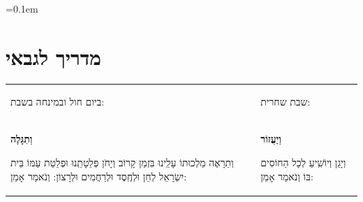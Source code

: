 \documentclass[a4paper, twoside, openany, parskip=half, 12pt]{article}
\newlength\iiindent
\newcommand\secindent{%
 \parshape 3 0pt \linewidth 0pt\dimexpr\linewidth-\iiindent\relax 0pt \linewidth
}
\begin{document}
\everypar{\secindent}
\setcounter{secnumdepth}{-1}
\setcounter{tocdepth}{1}
\addtolength{\topskip}{0pt plus 10pt}

 \font=0.1em%


\setlength{\emergencystretch}{3em} %








\newcommand{\source}[1]{\noindent \begin{tiny} \marginpar{\textsf{(#1)}} \end{tiny}}

\newcommand{\instruction}[1]{\noindent \begin{scriptsize} \textsf{#1} \end{scriptsize}}

\newcommand{\firstword}[1]{\begin{large}\textbf{#1}\end{large}} 

\newenvironment{sometimes}[1]{\begin{mdframed}[linecolor=sometimes, backgroundcolor=sometimes]
\leftskip=0pt plus-.5fil
\rightskip=0pt plus.5fil
\parfillskip=0pt plus1fil
}{\end{mdframed}} %

\newenvironment{kaddish}[1]{\begin{center}\begin{footnotesize}
		\leftskip=0pt plus-.5fil
		\rightskip=0pt plus.5fil
		\parfillskip=0pt plus1fil
	}{\end{footnotesize}\end{center}}



\section{ מדריך לגבאי }

\begin{tabular}{>{\centering\arraybackslash}m{} | >{\centering\arraybackslash}m{}}
\instruction{ביום חול ובמינחה בשבת:} & \instruction{שבת שחרית:} \\
 \firstword{וְתִגָּלֶה}
 וְתֵרָאֶה מַלְכוּתוֹ עָלֵֽינוּ בִּזְמַן קָרוֹב וְיָחֹן פְּלֵטָתֵֽנוּ וּפְלֵטַת עַמּוֹ בֵּית יִשְׂרָאֵל לְחֵן וּלְחֶֽסֶד וּלְרַחֲמִים וּלְרָצוֹן: וְנֹאמַר אָמֵן: 
 &
\firstword{וְיַעֲזוֹר}
וְיָגֵן וְיוֹשִֽׁיעַ לְכָל הַחוֹסִים בּוֹ וְנֹאמַר אָמֵן:
 \end{tabular}
 
\end{document}
